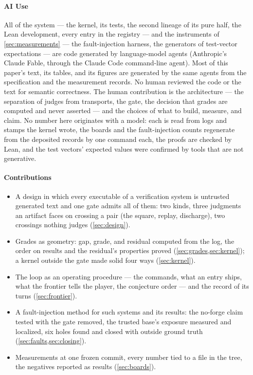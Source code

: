 \paragraph{AI Use}
All of the system --- the kernel, its tests, the second lineage of
its pure half, the Lean development, every entry in the registry ---
and the instruments of \cref{sec:measurements} --- the
fault-injection harness, the generators of test-vector expectations
--- are code generated by language-model agents (Anthropic's Claude
Fable, through the Claude Code command-line agent). Most of this
paper's text, its tables, and its figures are generated by the same
agents from the specification and the measurement records. No human
reviewed the code or the text for semantic correctness. The human
contribution is the architecture --- the separation of judges from
transports, the gate, the decision that grades are computed and never
asserted --- and the choices of what to build, measure, and claim.
No number here originates with a model: each is read from logs and
stamps the kernel wrote, the boards and the fault-injection counts
regenerate from the deposited records by one command each, the proofs
are checked by Lean, and the test vectors' expected values were
confirmed by tools that are not generative.

\paragraph{Contributions}
\begin{itemize}
\item A design in which every executable of a verification system is
  untrusted generated text and one gate admits all of them: two
  kinds, three judgments an artifact faces on crossing a pair (the
  square, replay, discharge), two crossings nothing judges
  (\cref{sec:design}).
\item Grades as geometry: gap, grade, and residual computed from the
  log, the order on results and the residual's properties proved
  (\cref{sec:grades,sec:kernel}); a kernel outside the gate made
  solid four ways (\cref{sec:kernel}).
\item The loop as an operating procedure --- the commands, what an
  entry ships, what the frontier tells the player, the conjecture
  order --- and the record of its turns (\cref{sec:frontier}).
\item A fault-injection method for such systems and its results: the
  no-forge claim tested with the gate removed, the trusted base's
  exposure measured and localized, six holes found and closed with
  outside ground truth (\cref{sec:faults,sec:closing}).
\item Measurements at one frozen commit, every number tied to a file
  in the tree, the negatives reported as results (\cref{sec:boards}).
\end{itemize}

